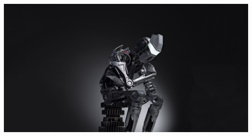 \pagestyle{empty}




    \thispagestyle{empty}

    \pagecolor{black}\afterpage{\nopagecolor}

    \begin{minipage}[t][0.8\paperheight]{0.8\paperwidth}
        \begin{center}

                  {\color{white} \fontsize{52}{104}\selectfont \textbf{\theTitle} }

                  \vspace{0.2\paperheight}


                  \includegraphics[width=0.75\paperwidth]{fig/augmented-intelligence}

                  \vspace{0.2\paperheight}

                 {\color{white} \fontsize{24}{48}\selectfont \textbf{\theAuthor} }
        \end{center}
    \end{minipage}

